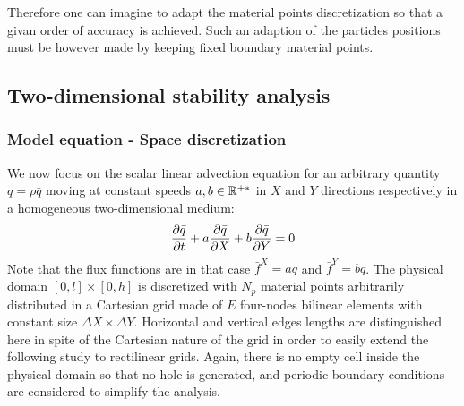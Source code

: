 Therefore one can imagine to adapt the material points discretization so that a givan order of accuracy is achieved. Such an adaption of the particles positions must be however made by keeping fixed boundary material points.

\subsection{Two-dimensional stability analysis}
\subsubsection*{Model equation - Space discretization}
We now focus on the scalar linear advection equation for an arbitrary quantity $q=\rho \bar{q}$ moving at constant speeds $a,b \in \mathbb{R}^{+*}$ in $X$ and $Y$ directions respectively in a homogeneous two-dimensional medium:
\begin{equation}
  \label{eq:2D_model_equation}
  \frac{\partial \bar{q}}{\partial t} + a\frac{\partial \bar{q}}{\partial X} + b\frac{\partial \bar{q}}{\partial Y}= 0
\end{equation}
Note that the flux functions are in that case $\bar{f}^X = a\bar{q}$ and $\bar{f}^Y = b\bar{q}$. The physical domain $[0,l]\times[0,h]$ is discretized with $N_p$ material points arbitrarily distributed in a Cartesian grid made of $E$ four-nodes bilinear elements with constant size $\Delta X \times \Delta Y$. Horizontal and vertical edges lengths are distinguished here in spite of the Cartesian nature of the grid in order to easily extend the following study to rectilinear grids. Again, there is no empty cell inside the physical domain so that no hole is generated, and periodic boundary conditions are considered to simplify the analysis.


